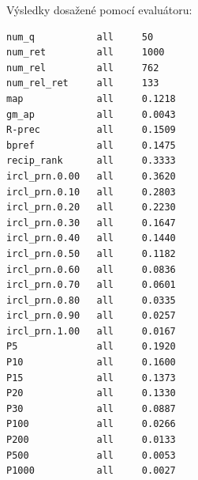 \documentclass[12pt, a4paper]{article}
\begin{document}
Výsledky dosažené pomocí evaluátoru:

\begin{verbatim}
num_q           all     50
num_ret         all     1000
num_rel         all     762
num_rel_ret     all     133
map             all     0.1218
gm_ap           all     0.0043
R-prec          all     0.1509
bpref           all     0.1475
recip_rank      all     0.3333
ircl_prn.0.00   all     0.3620
ircl_prn.0.10   all     0.2803
ircl_prn.0.20   all     0.2230
ircl_prn.0.30   all     0.1647
ircl_prn.0.40   all     0.1440
ircl_prn.0.50   all     0.1182
ircl_prn.0.60   all     0.0836
ircl_prn.0.70   all     0.0601
ircl_prn.0.80   all     0.0335
ircl_prn.0.90   all     0.0257
ircl_prn.1.00   all     0.0167
P5              all     0.1920
P10             all     0.1600
P15             all     0.1373
P20             all     0.1330
P30             all     0.0887
P100            all     0.0266
P200            all     0.0133
P500            all     0.0053
P1000           all     0.0027
\end{verbatim}
\end{document}
